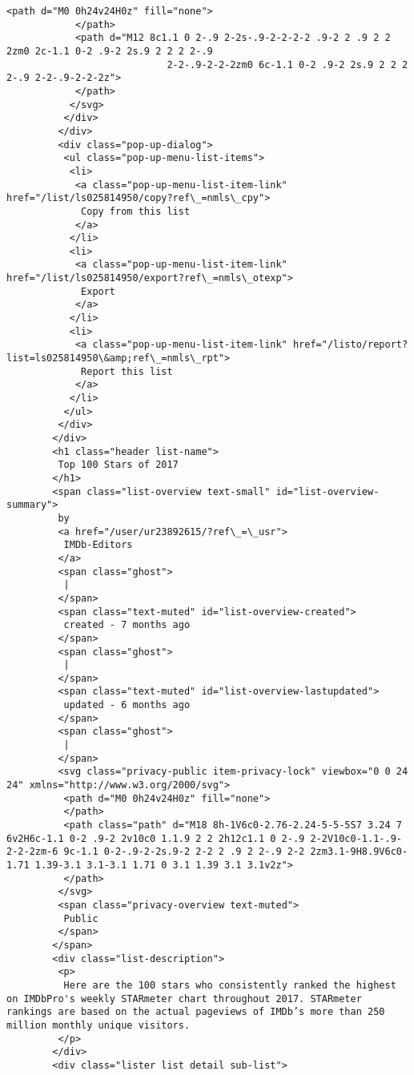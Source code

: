 \documentclass[11pt]{article}
\begin{document}
\begin{Verbatim}[commandchars=\\\{\}]
            <path d="M0 0h24v24H0z" fill="none">
            </path>
            <path d="M12 8c1.1 0 2-.9 2-2s-.9-2-2-2-2 .9-2 2 .9 2 2 2zm0 2c-1.1 0-2 .9-2 2s.9 2 2 2 2-.9 
                            2-2-.9-2-2-2zm0 6c-1.1 0-2 .9-2 2s.9 2 2 2 2-.9 2-2-.9-2-2-2z">
            </path>
           </svg>
          </div>
         </div>
         <div class="pop-up-dialog">
          <ul class="pop-up-menu-list-items">
           <li>
            <a class="pop-up-menu-list-item-link" href="/list/ls025814950/copy?ref\_=nmls\_cpy">
             Copy from this list
            </a>
           </li>
           <li>
            <a class="pop-up-menu-list-item-link" href="/list/ls025814950/export?ref\_=nmls\_otexp">
             Export
            </a>
           </li>
           <li>
            <a class="pop-up-menu-list-item-link" href="/listo/report?list=ls025814950\&amp;ref\_=nmls\_rpt">
             Report this list
            </a>
           </li>
          </ul>
         </div>
        </div>
        <h1 class="header list-name">
         Top 100 Stars of 2017
        </h1>
        <span class="list-overview text-small" id="list-overview-summary">
         by
         <a href="/user/ur23892615/?ref\_=\_usr">
          IMDb-Editors
         </a>
         <span class="ghost">
          |
         </span>
         <span class="text-muted" id="list-overview-created">
          created - 7 months ago
         </span>
         <span class="ghost">
          |
         </span>
         <span class="text-muted" id="list-overview-lastupdated">
          updated - 6 months ago
         </span>
         <span class="ghost">
          |
         </span>
         <svg class="privacy-public item-privacy-lock" viewbox="0 0 24 24" xmlns="http://www.w3.org/2000/svg">
          <path d="M0 0h24v24H0z" fill="none">
          </path>
          <path class="path" d="M18 8h-1V6c0-2.76-2.24-5-5-5S7 3.24 7 6v2H6c-1.1 0-2 .9-2 2v10c0 1.1.9 2 2 2h12c1.1 0 2-.9 2-2V10c0-1.1-.9-2-2-2zm-6 9c-1.1 0-2-.9-2-2s.9-2 2-2 2 .9 2 2-.9 2-2 2zm3.1-9H8.9V6c0-1.71 1.39-3.1 3.1-3.1 1.71 0 3.1 1.39 3.1 3.1v2z">
          </path>
         </svg>
         <span class="privacy-overview text-muted">
          Public
         </span>
        </span>
        <div class="list-description">
         <p>
          Here are the 100 stars who consistently ranked the highest on IMDbPro's weekly STARmeter chart throughout 2017. STARmeter rankings are based on the actual pageviews of IMDb’s more than 250 million monthly unique visitors.
         </p>
        </div>
        <div class="lister list detail sub-list">

\end{Verbatim}
\end{document}
